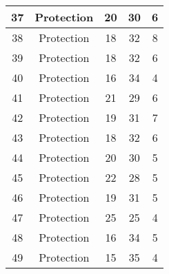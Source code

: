 \documentclass[results.tex]{subfiles}
\begin{document}
\begin{center}
\begin{tabular}{| c || c | c | c | c |}
            \hline
            37                      & Protection                   & 20                     & 30                      & 6                    \\
            \hline
            38                      & Protection                   & 18                     & 32                      & 8                    \\
            \hline
            39                      & Protection                   & 18                     & 32                      & 6                    \\
            \hline
            40                      & Protection                   & 16                     & 34                      & 4                    \\
            \hline
            41                      & Protection                   & 21                     & 29                      & 6                    \\
            \hline
            42                      & Protection                   & 19                     & 31                      & 7                    \\
            \hline
            43                      & Protection                   & 18                     & 32                      & 6                    \\
            \hline
            44                      & Protection                   & 20                     & 30                      & 5                    \\
            \hline
            45                      & Protection                   & 22                     & 28                      & 5                    \\
            \hline
            46                      & Protection                   & 19                     & 31                      & 5                    \\
            \hline
            47                      & Protection                   & 25                     & 25                      & 4                    \\
            \hline
            48                      & Protection                   & 16                     & 34                      & 5                    \\
            \hline
            49                      & Protection                   & 15                     & 35                      & 4                    \\
            \hline
        \end{tabular}
    \end{center}
\end{document}
